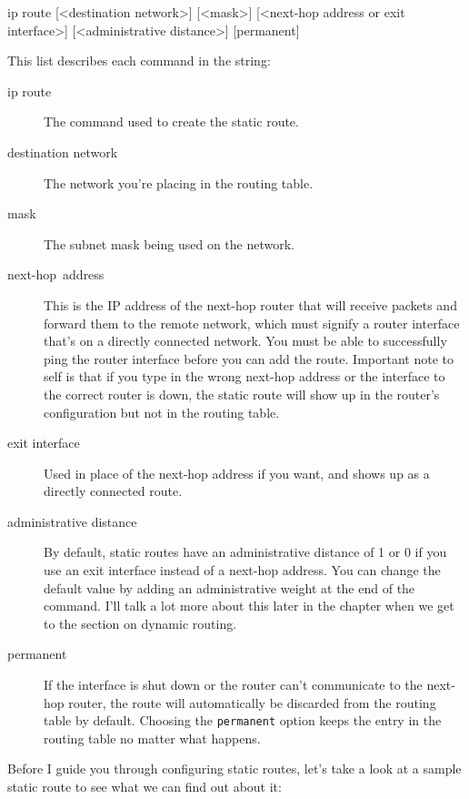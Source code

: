 \begin{cli}
ip route [<destination network>] [<mask>] [<next-hop address or
  exit interface>] [<administrative distance>] [permanent]
\end{cli}

This list describes each command in the string:
\begin{description}
\item[ip route]
   The command used to create the static route.
\item[\textlangle{}destination network\textrangle]
   The network you're placing in the routing table.
\item[\textlangle{}mask\textrangle]
   The subnet mask being used on the network.
\item[\textlangle{}next-hop~address\textrangle]
This is the IP address of the next-hop router
that will receive packets and forward them to the remote network, which
must signify a router interface that's on a directly connected network.
You must be able to successfully ping the router interface before you
can add the route. Important note to self is that if you type in the
wrong next-hop address or the interface to the correct router is down,
the static route will show up in the router's configuration but not in
the routing table.

\item[\textlangle{}exit interface\textrangle]
Used in place of the next-hop address if you
want, and shows up as a directly connected route.

\item[\textlangle{}administrative distance\textrangle]
By default, static routes have an
administrative distance of 1 or 0 if you use an exit interface instead
of a next-hop address. You can change the default value by adding an
administrative weight at the end of the command. I'll talk a lot more
about this later in the chapter when we get to the section on dynamic
routing.

\item[permanent]
   If the interface is shut down or the router can't communicate to the next-hop router, the route will automatically be discarded from the routing table by default.
   Choosing the \texttt{permanent} option keeps the entry in the routing table no matter what happens.
\end{description}
Before I guide you through configuring static routes, let's take a look
at a sample static route to see what we can find out about it:

